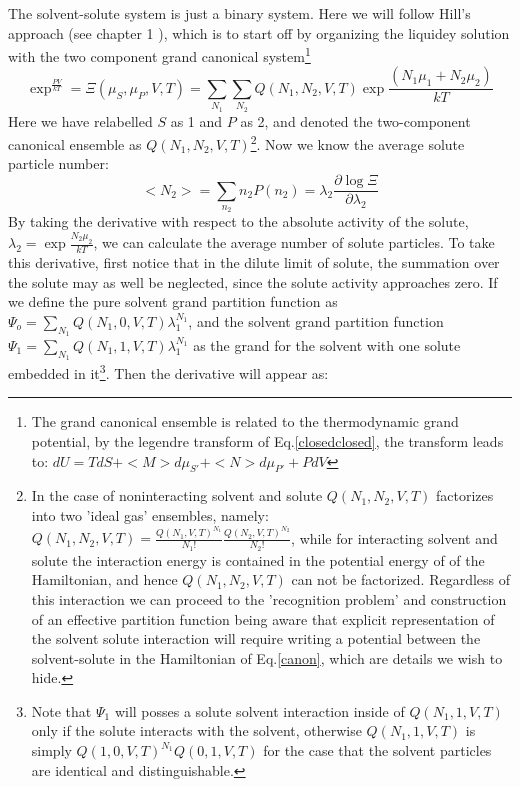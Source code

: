   
  The solvent-solute system is just a binary system.  Here we will follow Hill's approach (see chapter 1 \cite{hill}), which is to start off by organizing the liquidey solution with the two component grand canonical system\footnote{The grand canonical ensemble is related to the thermodynamic grand potential, by the legendre transform of Eq.\ref{closedclosed}, the transform leads to: $dU = TdS + <M> d\mu_{S'}  +<N> d\mu_{P'}  + PdV$}
  \begin{equation}\label{xi1}
    \exp^{\frac{PV}{kT} } = \Xi(\mu_S, \mu_P,V,T) = \sum_{N_1} \sum_{N_2} Q(N_1, N_2,V,T) \exp{\frac{(N_1 \mu_{1} + N_2 \mu_{2})}{kT}}
  \end{equation}
Here we have relabelled $S$ as 1 and $P$ as 2, and denoted the two-component canonical ensemble as $Q(N_1, N_2,V,T)$\footnote{In the case of noninteracting solvent and solute $Q(N_1, N_2,V,T)$ factorizes into two 'ideal gas' ensembles, namely:  $Q(N_1, N_2,V,T)=\frac{Q(N_1,V,T)^{N_1}}{N_1!} \frac{Q(N_2,V,T)^{N_2}}{N_2!}$, while for interacting solvent and solute the interaction energy is contained in the potential energy of of the Hamiltonian, and hence $Q(N_1, N_2,V,T)$ can not be factorized.  Regardless of this interaction we can proceed to the 'recognition problem' and construction of an effective partition function being aware that explicit representation of the solvent solute interaction will require writing a potential between the solvent-solute in the Hamiltonian of Eq.\ref{canon}, which are details we wish to hide.}.  Now we know the average solute particle number:
\begin{equation}\label{averageN1}
  < N_2 > = \sum_{n_2}  n_2 P(n_2) = \lambda_{2}  \frac{\partial\log \Xi}{\partial \lambda_{2}}
\end{equation}
By taking the derivative with respect to the absolute activity of the solute, $\lambda_{2}=\exp{\frac{N_2\mu_{2}}{kT}}$, we can calculate the average number of solute particles.  To take this derivative, first notice that in the dilute limit of solute, the summation over the solute may as well be neglected, since the solute activity approaches zero.  If we define the pure solvent grand partition function as $\Psi_o=\sum_{N_1} Q(N_1,0,V,T)\lambda_1^{N_1}$, and the solvent grand partition function $\Psi_1=\sum_{N_1} Q(N_1,1,V,T)\lambda_1^{N_1}$ as the grand for the solvent with one solute embedded in it\footnote{Note that $\Psi_1$ will posses a solute solvent interaction inside of $Q(N_1,1,V,T)$ only if the solute interacts with the solvent, otherwise $Q(N_1,1,V,T)$ is simply $Q(1,0,V,T)^{N_1}Q(0,1,V,T)$ for the case that the solvent particles are identical and distinguishable.}.  Then the derivative will appear as:
